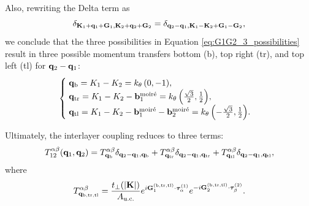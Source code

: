 Also, rewriting the Delta term as
\begin{equation} \label{eq:delta-term}
\delta_{{\vb{K}}_1 + {\vb{q}}_1 + {\vb{G}}_1, {\vb{K}}_2 + {\vb{q}}_2 + {\vb{G}}_2} = \delta_{{\vb{q}}_2 - {\vb{q}}_1, {\vb{K}}_1 - {\vb{K}}_2 + {\vb{G}}_1 - {\vb{G}}_2},
\end{equation}
we conclude that the three possibilities in Equation \ref{eq:G1G2_3_possibilities} result in three possible momentum transfers bottom (b), top right (tr), and top left (tl) for ${\vb{q}}_2-{\vb{q}}_1$:
\begin{equation} \label{eq:qb_qtr_qtl}
\begin{cases}
\; {\vb{q}}_\text{b} = K_1 - K_2 = k_\theta \, (0, -1), \\
\; {\vb{q}}_\text{tr} = K_1 - K_2 - {\vb{b}}_1^{\text{moiré}} = k_\theta \, \qty(\frac{\sqrt{3}}{2}, \frac{1}{2}), \\
\; {\vb{q}}_\text{tl} = K_1 - K_2 -{\vb{b}}_1^{\text{moiré}}-{\vb{b}}_2^{\text{moiré}} = k_\theta \, \qty(-\frac{\sqrt{3}}{2}, \frac{1}{2}).
\end{cases}
\end{equation}

Ultimately, the interlayer coupling reduces to three terms:
\begin{equation} \label{eq:interlayer-3terms}
T_{12}^{\alpha\beta}({\vb{q}}_1, {\vb{q}}_2) = T^{\alpha\beta}_{{\vb{q}}_\text{b}} \delta_{{\vb{q}}_2 - {\vb{q}}_1, {\vb{q}}_\text{b}}
+ T^{\alpha\beta}_{{\vb{q}}_\text{tr}} \delta_{{\vb{q}}_2 - {\vb{q}}_1, {\vb{q}}_\text{tr}}
+ T^{\alpha\beta}_{{\vb{q}}_\text{tl}} \delta_{{\vb{q}}_2 - {\vb{q}}_1, {\vb{q}}_\text{tl}},
\end{equation}
where
\begin{equation} \label{eq:interlayer-tensor}
T^{\alpha\beta}_{{\vb{q}}_{\text{b},\text{tr},\text{tl}}} = \frac{t_\perp(\abs{{\vb{K}}})}{A_{\text{u.c.}}} e^{i {\vb{G}}_{1}^{(\text{b},\text{tr},\text{tl})} \cdot \bm{\tau}_{\alpha}^{(1)}}
e^{-i {\vb{G}}_{2}^{(\text{b},\text{tr},\text{tl})} \cdot \bm{\tau}_{\beta}^{(2)}}.
\end{equation}

